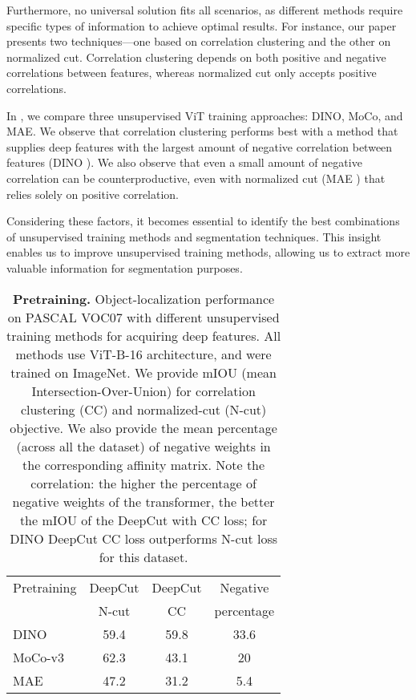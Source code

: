 \documentclass[10pt,twocolumn,letterpaper]{article}
\begin{document}
Furthermore, no universal solution fits all scenarios, as different methods require specific types of information to achieve optimal results. For instance, our paper presents two techniques—one based on correlation clustering and the other on normalized cut. Correlation clustering depends on both positive and negative correlations between features, whereas normalized cut only accepts positive correlations.

In , we compare three unsupervised ViT training approaches: DINO\cite{caron2021emerging}, MoCo\cite{chen2021empirical}, and MAE\cite{he2022masked}. We observe that correlation clustering performs best with a method that supplies deep features with the largest amount of negative correlation between features (DINO ). We also observe that even a small amount of negative correlation can be counterproductive, even with normalized cut (MAE ) that relies solely on positive correlation.

Considering these factors, it becomes essential to identify the best combinations of unsupervised training methods and segmentation techniques. This insight enables us to improve unsupervised training methods, allowing us to extract more valuable information for segmentation purposes.



\begin{table}
  \centering
  \begin{tabular}{@{}lc c c@{}}
    \toprule
    Pretraining  & DeepCut & DeepCut  &Negative   \\
     &  N-cut & CC & percentage  \\

        \midrule
    DINO\cite{caron2021emerging}  & 59.4 & 59.8 & 33.6\\
    MoCo-v3\cite{chen2021empirical}  & 62.3 & 43.1 & 20\\
    MAE \cite{he2022masked}  & 47.2 &  31.2 & 5.4\\

    \bottomrule
  \end{tabular}
  \caption{\textbf{Pretraining.} Object-localization performance on PASCAL VOC07\cite{pascal-voc-2007}
  with different unsupervised training methods for acquiring deep features. All methods use ViT-B-16 architecture, and were trained on ImageNet\cite{ILSVRC15}.
  We provide mIOU (mean Intersection-Over-Union) for correlation clustering (CC) and normalized-cut (N-cut) objective.
  We also provide the mean percentage (across all the dataset) of negative weights in the corresponding affinity matrix. Note the correlation: the higher the percentage of negative weights of the transformer, the better the mIOU of the DeepCut with CC loss; for DINO DeepCut CC loss outperforms N-cut loss for this dataset.
  }
  \label{tab:feats}
\end{table}
\end{document}
